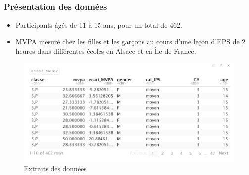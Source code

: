 \documentclass{beamer}
\begin{document}
		\begin{frame}
			\frametitle{Présentation des données} 
			\begin{itemize}
				\item Participants âgés de 11 à 15 ans, pour un total de 462.
				\vfill
				\item MVPA mesuré chez les filles et les garçons au cours d'une leçon d'EPS de 2 heures dans différentes écoles en Alsace et en Île-de-France.
			\end{itemize}
			\begin{figure}[H]
				\centering
				\includegraphics[width=0.95\linewidth]{Extrai_donnée.PNG}
				\caption{Extraits des données}
				\label{fig:image1}
			\end{figure}
		\end{frame}
		
\end{document}
